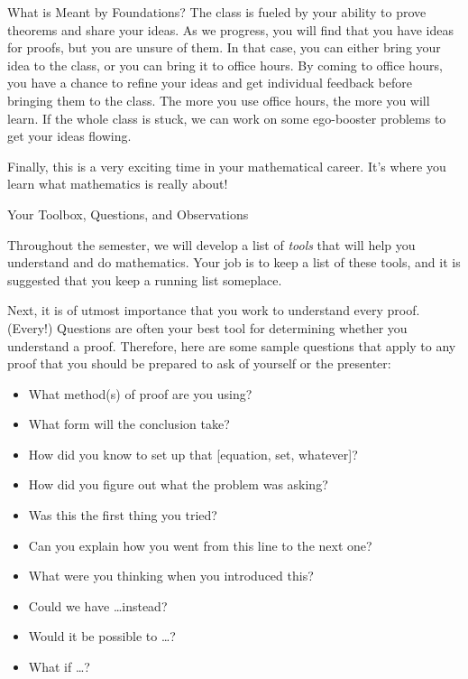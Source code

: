 \begin{section*}{What is Meant by Foundations?}
The class is fueled by your ability to prove theorems and share your ideas.  As we progress, you will find that you have ideas for proofs, but you are unsure of them.  In that case, you can either bring your idea to the class, or you can bring it to office hours.  By coming to office hours, you have a chance to refine your ideas and get individual feedback before bringing them to the class.  The more you use office hours, the more you will learn.  If the whole class is stuck, we can work on some ego-booster problems to get your ideas flowing.

Finally, this is a very exciting time in your mathematical career.  It's where you learn what mathematics is really about!

\end{section*}

\begin{section*}{Your Toolbox, Questions, and Observations}

Throughout the semester, we will develop a list of \emph{tools} that will help you understand and do mathematics. Your job is to keep a list of these tools, and it is suggested that you keep a running list someplace.

Next, it is of utmost importance that you work to understand every proof. (Every!)  Questions are often your best tool for determining whether you understand a proof.  Therefore, here are some sample questions that apply to any proof that you should be prepared to ask of yourself or the presenter:
\begin{itemize}
\item What method(s) of proof are you using?
\item What form will the conclusion take?
\item How did you know to set up that [equation, set, whatever]?
\item How did you figure out what the problem was asking?
\item Was this the first thing you tried?
\item Can you explain how you went from this line to the next one?
\item What were you thinking when you introduced this?
\item Could we have \ldots instead?
\item Would it be possible to \ldots?
\item What if \ldots?
\end{itemize}


\end{section*}
